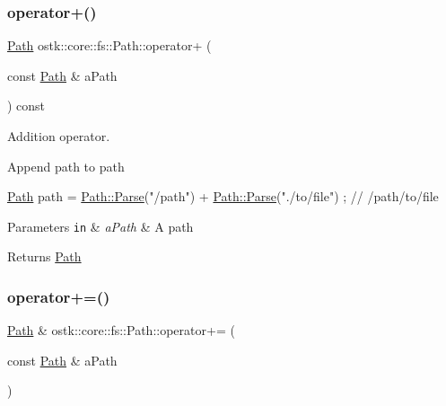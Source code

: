 \subsubsection{\texorpdfstring{operator+()}{operator+()}}
{\footnotesize\ttfamily \hyperlink{classostk_1_1core_1_1fs_1_1_path}{Path} ostk\+::core\+::fs\+::\+Path\+::operator+ (\begin{DoxyParamCaption}\item[{const \hyperlink{classostk_1_1core_1_1fs_1_1_path}{Path} \&}]{a\+Path }\end{DoxyParamCaption}) const}



Addition operator. 

Append path to path


\begin{DoxyCode}
\hyperlink{classostk_1_1core_1_1fs_1_1_path_a1a5fff28594542489223b4cfad6cc9fb}{Path} path = \hyperlink{classostk_1_1core_1_1fs_1_1_path_ad08539ba654f5df11c4bcb07276345ad}{Path::Parse}(\textcolor{stringliteral}{"/path"}) + \hyperlink{classostk_1_1core_1_1fs_1_1_path_ad08539ba654f5df11c4bcb07276345ad}{Path::Parse}(\textcolor{stringliteral}{"./to/file"}) ; \textcolor{comment}{// /path/to/file}
\end{DoxyCode}



\begin{DoxyParams}[1]{Parameters}
\mbox{\tt in}  & {\em a\+Path} & A path \\
\hline
\end{DoxyParams}
\begin{DoxyReturn}{Returns}
\hyperlink{classostk_1_1core_1_1fs_1_1_path}{Path} 
\end{DoxyReturn}
\mbox{\label{classostk_1_1core_1_1fs_1_1_path_afa271ae42cee66d28f4aab1210922354}} 
\subsubsection{\texorpdfstring{operator+=()}{operator+=()}}
{\footnotesize\ttfamily \hyperlink{classostk_1_1core_1_1fs_1_1_path}{Path} \& ostk\+::core\+::fs\+::\+Path\+::operator+= (\begin{DoxyParamCaption}\item[{const \hyperlink{classostk_1_1core_1_1fs_1_1_path}{Path} \&}]{a\+Path }\end{DoxyParamCaption})}



